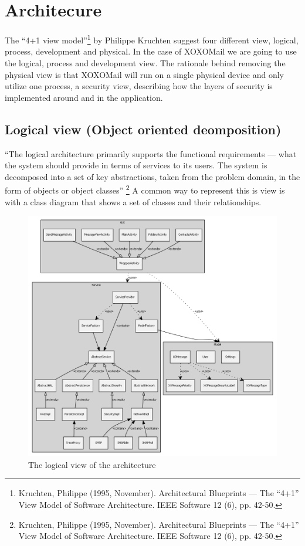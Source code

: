 \section{Architecure}
The “4+1 view model”\footnote{Kruchten, Philippe (1995, November). Architectural Blueprints — The “4+1” View Model of Software Architecture. IEEE Software 12 (6), pp. 42-50.} by Philippe Kruchten suggest four different view, logical, process, development and physical. In the case of XOXOMail we are going to use the logical, process and development view. The rationale behind removing the physical view is that XOXOMail will run on a single physical device and only utilize one process, a security view, describing how the layers of security is implemented around and in the application.

\subsection{Logical view (Object oriented deomposition)}
“The logical architecture primarily supports the functional requirements --- what the system should provide in terms of services to its users. The system is decomposed into a set of key abstractions, taken from the problem domain, in the form of objects or object classes” \footnote{Kruchten, Philippe (1995, November). Architectural Blueprints — The “4+1” View Model of Software Architecture. IEEE Software 12 (6), pp. 42-50.} A common way to represent this is view is with a class diagram that shows a set of classes and their relationships.

\begin{figure}
	\includegraphics[width=\textwidth]{logicalview.png}
	\caption{The logical view of the architecture}
	\label{fig:logicalview}
\end{figure}
